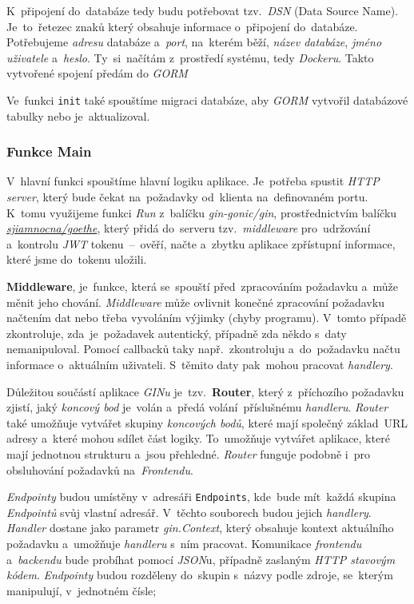 \documentclass[10pt,a4paper]{article}
\begin{document}
            K~připojení do~databáze tedy budu potřebovat tzv.~\emph{DSN} (Data Source Name). Je~to~řetezec znaků který obsahuje informace o~připojení do~databáze. Potřebujeme \emph{adresu} databáze a~\emph{port}, na~kterém běží, \emph{název databáze}, \emph{jméno uživatele} a~\emph{heslo}. Ty~si~načítám z~prostředí systému, tedy \emph{Dockeru}. Takto vytvořené spojení předám do \emph{GORM}

            Ve~funkci \texttt{init} také spouštíme migraci databáze, aby \emph{GORM} vytvořil databázové tabulky nebo je~aktualizoval.


        \subsubsection{Funkce Main}
            V~hlavní funkci spouštíme hlavní logiku aplikace. Je~potřeba spustit \emph{HTTP server}, který bude čekat na~požadavky od~klienta na~definovaném portu. K~tomu využijeme funkci \emph{Run} z~balíčku \emph{gin-gonic/gin}, prostřednictvím balíčku \href{https://gitlab.com/sjiamnocna/goethe}{\emph{sjiamnocna/goethe}}, který přidá do~serveru tzv.~\emph{middleware} pro~udržování a~kontrolu \emph{JWT} tokenu~--~ověří, načte a~zbytku aplikace zpřístupní informace, které jsme do~tokenu uložili.
            
            \textbf{Middleware}, je~funkce, která se~spouští před~zpracováním požadavku a~může měnit jeho chování. \emph{Middleware} může ovlivnit konečné zpracování požadavku načtením dat nebo třeba vyvoláním výjimky (chyby programu). V~tomto případě zkontroluje, zda~je~požadavek autentický, případně zda někdo s~daty nemanipuloval. Pomocí callbacků taky např.~zkontroluju a~do~požadavku načtu informace o~aktuálním uživateli. S~těmito daty pak~mohou pracovat \emph{handlery}.

            Důležitou součástí aplikace \emph{GINu} je~tzv.~\textbf{Router}, který z~příchozího požadavku zjistí, jaký \emph{koncový bod} je~volán a~předá volání~příslušnému \emph{handleru}. \emph{Router} také umožňuje vytvářet skupiny \emph{koncových bodů}, které mají společný základ~URL adresy a~které mohou sdílet část logiky. To~umožňuje vytvářet aplikace, které mají jednotnou strukturu a~jsou přehledné. \emph{Router} funguje podobně i~pro obsluhování požadavků na~\emph{Frontendu}.

            \emph{Endpointy} budou umístěny v~adresáři \texttt{Endpoints}, kde~bude mít~každá skupina \emph{Endpointů} svůj vlastní adresář. V~těchto souborech budou jejich \emph{handlery}. \emph{Handler} dostane jako parametr \emph{gin.Context}, který obsahuje kontext aktuálního požadavku a~umožňuje \emph{handleru} s~ním pracovat. Komunikace \emph{frontendu} a~\emph{backendu} bude probíhat pomocí \emph{JSON}u, případně zaslaným \emph{HTTP stavovým kódem}. \emph{Endpointy} budou rozděleny do~skupin s~názvy podle zdroje, se~kterým manipulují, v~jednotném čísle;
\end{document}
